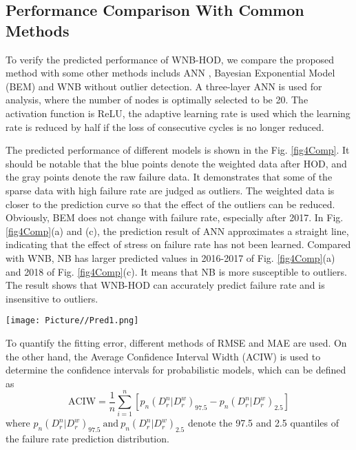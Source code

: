 \documentclass[journal,twoside,web]{ieeecolor}
\begin{document}
\subsection{Performance Comparison With Common Methods}
To verify the predicted performance of WNB-HOD, we compare the proposed method with some other methods includs ANN \cite{KUTYLOWSKA201541}, Bayesian Exponential Model (BEM) \cite{1046900} and WNB without outlier detection. A three-layer ANN is used for analysis, where the number of nodes is optimally selected to be 20. The activation function is ReLU, the adaptive learning rate is used which the learning rate is reduced by half if the loss of consecutive cycles is no longer reduced.

The predicted performance of different models is shown in the Fig. \ref{fig4Comp}. It should be notable that the blue points denote the weighted data after HOD, and the gray points denote the raw failure data. It demonstrates that some of the sparse data with high failure rate are judged as outliers. The weighted data is closer to the prediction curve so that the effect of the outliers can be reduced.
Obviously, BEM does not change with failure rate, especially after 2017. In Fig. \ref{fig4Comp}(a) and (c), the prediction result of ANN approximates a straight line, indicating that the effect of stress on failure rate has not been learned. 
Compared with WNB, NB has larger predicted values in 2016-2017 of Fig. \ref{fig4Comp}(a) and 2018 of Fig. \ref{fig4Comp}(c). It means that NB is more susceptible to outliers. The result shows that WNB-HOD can accurately predict failure rate and is insensitive to outliers.


\begin{figure*}
	\centering
	\texttt{[image: Picture//Pred1.png]}
	\caption{Comparison of failure rate prediction for four methods. (a) XJ, (b) XZ, (c) TI.}
	\label{fig4Comp}
\end{figure*}


To quantify the fitting error, different methods of RMSE and MAE are used. On the other hand, the Average Confidence Interval Width (ACIW) is used to determine the confidence intervals for probabilistic models, which can be defined as
\begin{equation}\label{eq21ACIW}
\text{ACIW} = \frac{1}{n}\sum_{i=1}^{n} [p_n(D_{r}^{n}|D_{r}^{w})_{97.5} - p_n(D_{r}^{n}|D_{r}^{w})_{2.5}]
\end{equation}
where $ p_n(D_{r}^{n}|D_{r}^{w})_{97.5} ~ \text{and}~ p_n(D_{r}^{n}|D_{r}^{w})_{2.5} $ denote the 97.5 and 2.5 quantiles of the failure rate prediction distribution.
\end{document}
